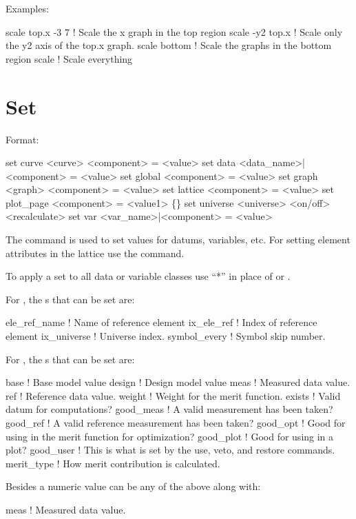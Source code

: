 Examples:
\begin{example}
  scale top.x -3  7  ! Scale the x graph in the top region
  scale -y2 top.x    ! Scale only the y2 axis of the top.x graph.
  scale bottom       ! Scale the graphs in the bottom region
  scale              ! Scale everything
\end{example}


\section{Set}
\label{s:set}

Format:
\begin{example}
  set curve <curve> <component> = <value>
  set data <data_name>|<component> = <value>
  set global <component> = <value>
  set graph <graph> <component> = <value>
  set lattice <component> = <value>
  set plot_page <component> = <value1> \{<value2>\}
  set universe <universe> <on/off> <recalculate>
  set var <var_name>|<component> = <value>
\end{example}

\vskip 0.2in 
The  command is used to set values for datums,
variables, etc.  For setting element attributes in the 
lattice use the  command.

To apply a set to all data or variable classes use ``*''
in place of  or .

For , the s that can be set are:
\begin{example}
  ele_ref_name   ! Name of reference element
  ix_ele_ref     ! Index of reference element
  ix_universe    ! Universe index.
  symbol_every   ! Symbol skip number.
\end{example}

For , the s that can be set are:
\begin{example}
  base        ! Base model value
  design      ! Design model value
  meas        ! Measured data value.
  ref         ! Reference data value.
  weight      ! Weight for the merit function.
  exists      ! Valid datum for computations?
  good_meas   ! A valid measurement has been taken?
  good_ref    ! A valid reference measurement has been taken?
  good_opt    ! Good for using in the merit function for optimization?
  good_plot   ! Good for using in a plot?
  good_user   ! This is what is set by the use, veto, and restore commands.
  merit_type  ! How merit contribution is calculated.
\end{example}
Besides a numeric value  can be any of the above along with:
\begin{example}
  meas        ! Measured data value.
\end{example}
\vskip 0.2in

